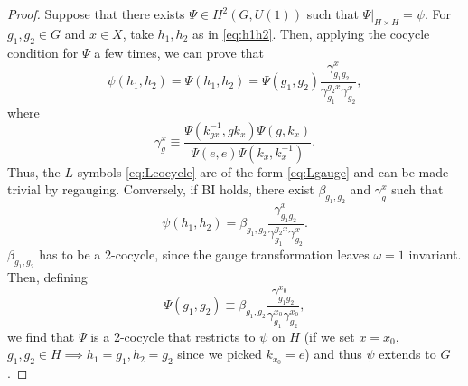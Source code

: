\documentclass[reprint,
superscriptaddress,
amsmath,amssymb,
notitlepage,
aps,
prb,
10pt, 
tightenlines
]{revtex4-2}
\begin{document}
\begin{proof}
Suppose that there exists $\Psi\in H^2(G,U(1))$ such that $\Psi\left.\right|_{H\times H}=\psi$. For $g_1,g_2\in G$ and $x\in X$, take $h_1,h_2$ as in \eqref{eq:h1h2}. Then, applying the cocycle condition for $\Psi$ a few times, we can prove that
\begin{equation}
    \psi(h_1, h_2)=\Psi(h_1, h_2)=\Psi(g_1, g_2)\dfrac{\gamma^x_{g_1g_2}}{\gamma^{g_2x}_{g_1}\gamma^x_{g_2}},
\end{equation}
where 
\begin{equation}
    \gamma^x_{g}\equiv\dfrac{\Psi(k^{-1}_{gx}, gk_x)\Psi(g, k_x)}{\Psi(e,e)\Psi(k_x,k_x^{-1})}.
\end{equation} Thus, the $L$-symbols \eqref{eq:Lcocycle} are of the form \eqref{eq:Lgauge} and can be made trivial by regauging. Conversely, if BI holds, there exist $\beta_{g_1, g_2}$ and $\gamma_g^x$ such that 
\begin{equation}
    \psi(h_1, h_2) = \beta_{g_1,g_2}\dfrac{\gamma^x_{g_1g_2}}{\gamma^{g_2x}_{g_1}\gamma^x_{g_2}}.
\end{equation}
$\beta_{g_1,g_2}$ has to be a 2-cocycle, since the gauge transformation leaves $\omega=1$ invariant. Then, defining
\begin{equation}
    \Psi(g_1,g_2) \equiv \beta_{g_1,g_2}\dfrac{\gamma^{x_0}_{g_1g_2}}{\gamma^{x_0}_{g_1}\gamma^{x_0}_{g_2}},
\end{equation}
we find that $\Psi$ is a 2-cocycle that restricts to $\psi$ on $H$ (if we set $x=x_0$, $g_1,g_2\in H\implies h_1=g_1, h_2=g_2$ since we picked $k_{x_0}=e$) and thus $\psi$ extends to $G$.
\end{proof}


\end{document}
